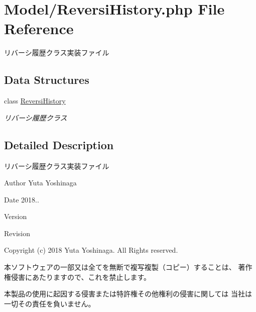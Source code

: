 \hypertarget{_reversi_history_8php}{}\section{Model/\+Reversi\+History.php File Reference}
\label{_reversi_history_8php}


リバーシ履歴クラス実装ファイル  


\subsection*{Data Structures}
\begin{DoxyCompactItemize}
\item 
class \hyperlink{class_reversi_history}{Reversi\+History}
\begin{DoxyCompactList}\small\item\em リバーシ履歴クラス \end{DoxyCompactList}\end{DoxyCompactItemize}


\subsection{Detailed Description}
リバーシ履歴クラス実装ファイル 

\begin{DoxyAuthor}{Author}
Yuta Yoshinaga 
\end{DoxyAuthor}
\begin{DoxyDate}{Date}
2018.. 
\end{DoxyDate}
\begin{DoxyParagraph}{Version}

\end{DoxyParagraph}
\begin{DoxyParagraph}{Revision}

\end{DoxyParagraph}


Copyright (c) 2018 Yuta Yoshinaga. All Rights reserved.


\begin{DoxyItemize}
\item 本ソフトウェアの一部又は全てを無断で複写複製（コピー）することは、 著作権侵害にあたりますので、これを禁止します。
\item 本製品の使用に起因する侵害または特許権その他権利の侵害に関しては 当社は一切その責任を負いません。 
\end{DoxyItemize}